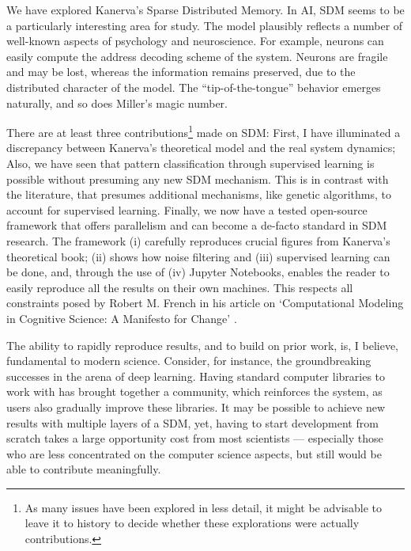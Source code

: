 


We have explored Kanerva’s Sparse Distributed Memory.   In AI, SDM seems to be a particularly interesting area for study.  The model plausibly reflects a number of well-known aspects of psychology and neuroscience.  For example, neurons can easily compute the address decoding scheme of the system.  Neurons are fragile and may be lost, whereas the information remains preserved, due to the distributed character of the model.  The ``tip-of-the-tongue'' behavior emerges naturally, and so does Miller’s magic number.

There are at least three contributions\footnote{As many issues have been explored in less detail, it might be advisable to leave it to history to decide whether these explorations were actually contributions.} made on SDM:  First, I have illuminated a discrepancy between Kanerva’s theoretical model and the real system dynamics; Also, we have seen that pattern classification through supervised learning is possible without presuming any new SDM mechanism. This is in contrast with the literature, that presumes additional mechanisms, like genetic algorithms, to account for supervised learning.  Finally, we now have a tested open-source framework that offers parallelism and can become a de-facto standard in SDM research.  The framework (i) carefully reproduces crucial figures from Kanerva’s theoretical book; (ii) shows how noise filtering and (iii) supervised learning can be done, and, through the use of (iv) Jupyter Notebooks, enables the reader to easily reproduce all the results on their own machines. This respects all constraints posed by Robert M. French in his article on `Computational Modeling in Cognitive Science: A Manifesto for Change' \citep{TOPS:TOPS1206}.

The ability to rapidly reproduce results, and to build on prior work, is, I believe, fundamental to modern science.  Consider, for instance, the groundbreaking successes in the arena of deep learning.  Having standard computer libraries to work with has brought together a community, which reinforces the system, as users also gradually improve these libraries. It may be possible to achieve new results with multiple layers of a SDM, yet, having to start development from scratch takes a large opportunity cost from most scientists --- especially those who are less concentrated on the computer science aspects, but still would be able to contribute meaningfully.

